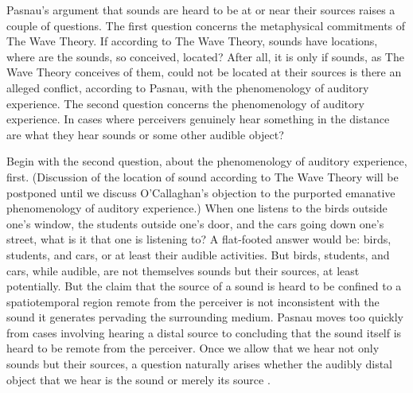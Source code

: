 Pasnau's argument that sounds are heard to be at or near their sources raises a couple of questions. The first question concerns the metaphysical commitments of The Wave Theory. If according to The Wave Theory, sounds have locations, where are the sounds, so conceived, located? After all, it is only if sounds, as The Wave Theory conceives of them, could not be located at their sources is there an alleged conflict, according to Pasnau, with the phenomenology of auditory experience.  The second question concerns the phenomenology of auditory experience. In cases where perceivers genuinely hear something in the distance are what they hear sounds or some other audible object? 

Begin with the second question, about the phenomenology of auditory experience, first. (Discussion of the location of sound according to The Wave Theory will be postponed until we discuss O'Callaghan's \citeyear{OCallaghan:2007xy,OCallaghan:2009aa} objection to the purported emanative phenomenology of auditory experience.) When one listens to the birds outside one's window, the students outside one's door, and the cars going down one's street, what is it that one is listening to? A flat-footed answer would be: birds, students, and cars, or at least their audible activities. But birds, students, and cars, while audible, are not themselves sounds but their sources, at least potentially. But the claim that the source of a sound is heard to be confined to a spatiotemporal region remote from the perceiver is not inconsistent with the sound it generates pervading the surrounding medium. Pasnau moves too quickly from cases involving hearing a distal source to concluding that the sound itself is heard to be remote from the perceiver. Once we allow that we hear not only sounds but their sources, a question naturally arises whether the audibly distal object that we hear is the sound or merely its source \citep[see][123, for a development of this worry]{OShaughnessy:2009aa}.

